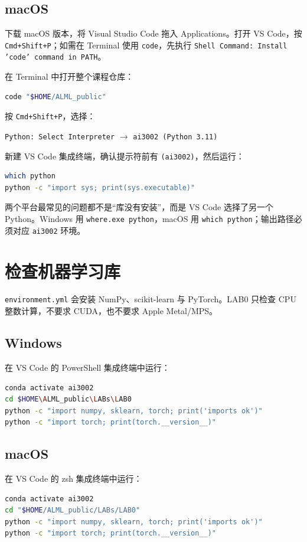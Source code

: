 \documentclass[11pt,a4paper]{article}
\newcommand{\windows}{\subsection*{\textcolor{windowsblue}{Windows}}}
\newcommand{\macos}{\subsection*{\textcolor{macgray}{macOS}}}
\begin{document}
\macos

下载 macOS 版本，将 Visual Studio Code 拖入 Applications。打开 VS Code，按 \texttt{Cmd+Shift+P}；如需在 Terminal 使用 \texttt{code}，先执行 \texttt{Shell Command: Install 'code' command in PATH}。

在 Terminal 中打开整个课程仓库：

\begin{lstlisting}[language=bash]
code "$HOME/ALML_public"
\end{lstlisting}

按 \texttt{Cmd+Shift+P}，选择：

\begin{center}
\texttt{Python: Select Interpreter} $\longrightarrow$ \texttt{ai3002 (Python 3.11)}
\end{center}

新建 VS Code 集成终端，确认提示符前有 \texttt{(ai3002)}，然后运行：

\begin{lstlisting}[language=bash]
which python
python -c "import sys; print(sys.executable)"
\end{lstlisting}

\begin{importantbox}
两个平台最常见的问题都不是“库没有安装”，而是 VS Code 选择了另一个 Python。Windows 用 \texttt{where.exe python}，macOS 用 \texttt{which python}；输出路径必须对应 \texttt{ai3002} 环境。
\end{importantbox}

\section{检查机器学习库}

\texttt{environment.yml} 会安装 NumPy、scikit-learn 与 PyTorch。LAB0 只检查 CPU 整数计算，不要求 CUDA，也不要求 Apple Metal/MPS。

\windows

在 VS Code 的 PowerShell 集成终端中运行：

\begin{lstlisting}[language=bash]
conda activate ai3002
cd $HOME\ALML_public\LABs\LAB0
python -c "import numpy, sklearn, torch; print('imports ok')"
python -c "import torch; print(torch.__version__)"
\end{lstlisting}

\macos

在 VS Code 的 zsh 集成终端中运行：

\begin{lstlisting}[language=bash]
conda activate ai3002
cd "$HOME/ALML_public/LABs/LAB0"
python -c "import numpy, sklearn, torch; print('imports ok')"
python -c "import torch; print(torch.__version__)"
\end{lstlisting}
\end{document}
